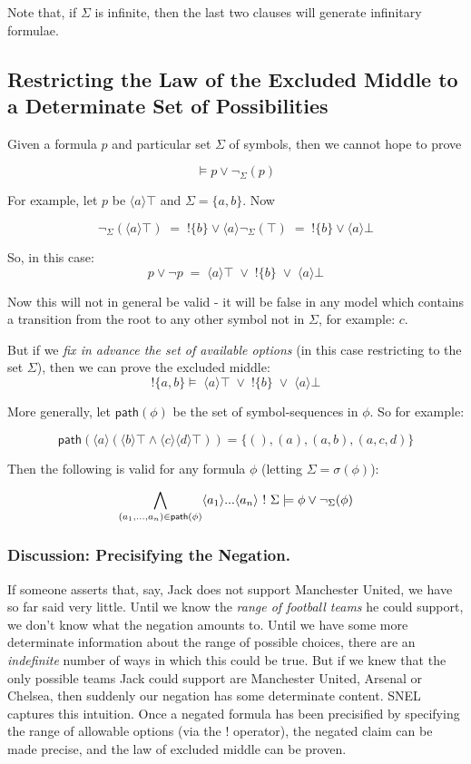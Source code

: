 \NI Note that, if $\Sigma$ is infinite, then the last two clauses will generate infinitary formulae.

\subsection{Restricting the Law of the Excluded Middle to a Determinate Set of Possibilities}

Given a formula $p$ and particular set $\Sigma$ of symbols, then we
cannot hope to prove

\[
\models p \lor \neg_\Sigma(p)
\]

\NI For example, let $p$ be $\langle a \rangle \top$ and $\Sigma = \{a,
b\}$.  Now

\[
\neg_\Sigma(\langle a \rangle \top) \; = \; ! \{b\} \lor \langle a \rangle \neg_\Sigma(\top) \; =  \; ! \{b\} \lor \langle a \rangle \bot
\]

\NI So, in this case:
\[
p \lor \neg p \; = \; \langle a \rangle \top \; \lor \; ! \{b\} \; \lor \; \langle a \rangle \bot
\]

\NI Now this will not in general be valid - it will be false in any model
which contains a transition from the root to any other symbol not in
$\Sigma$, for example: $c$.

But if we \emph{fix in advance the set of available options} (in this
case restricting to the set $\Sigma$), then we can prove the excluded
middle:
\[
!\{a, b\} \models \; \langle a \rangle \top \; \lor \; ! \{b\} \; \lor \; \langle a \rangle \bot
\]

\NI More generally, let $\mathsf{path}(\phi)$ be the set of
symbol-sequences in $\phi$.  So for example:

\[
\mathsf{path}(\langle a \rangle (\langle b \rangle \top \land \langle c \rangle \langle d \rangle \top)) = \{(), (a), (a, b), (a, c, d)\}
\]

\NI Then the following is valid for any formula $\phi$ (letting
$\Sigma = \sigma(\phi)$):

\[
\bigwedge_{(a_1, ..., a_n) \in \mathsf{path}(\phi)} \langle a_1 \rangle ... \langle a_n \rangle \ ! \  \Sigma \models \phi \lor \neg_\Sigma (\phi)
\]

\subsubsection{Discussion: Precisifying the Negation. }

\NI If someone asserts that, say, Jack does not support Manchester United,
we have so far said very little.  Until we know the \emph{range of
  football teams} he could support, we don't know what the negation
amounts to.  Until we have some more determinate information about the
range of possible choices, there are an \emph{indefinite} number of
ways in which this could be true.  But if we knew that the only
possible teams Jack could support are Manchester United, Arsenal or
Chelsea, then suddenly our negation has some determinate content.
SNEL captures this intuition.  Once a negated formula has been
precisified by specifying the range of allowable options (via the $!$
operator), the negated claim can be made precise, and the law of
excluded middle can be proven.

